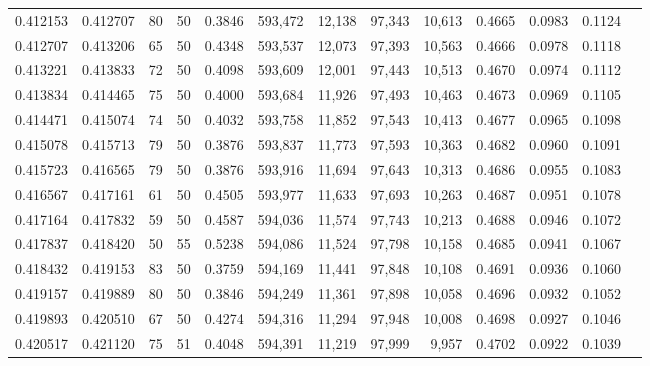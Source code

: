 \begin{tabular}{rrrrrrrrrrrrr}
0.412153 & 0.412707 &    80 &  50 &                                     0.3846 & 593,472 &  12,138 &  97,343 &  10,613 & 0.4665 & 0.0983 & 0.1124 \\
0.412707 & 0.413206 &    65 &  50 &                                     0.4348 & 593,537 &  12,073 &  97,393 &  10,563 & 0.4666 & 0.0978 & 0.1118 \\
0.413221 & 0.413833 &    72 &  50 &                                     0.4098 & 593,609 &  12,001 &  97,443 &  10,513 & 0.4670 & 0.0974 & 0.1112 \\
0.413834 & 0.414465 &    75 &  50 &                                     0.4000 & 593,684 &  11,926 &  97,493 &  10,463 & 0.4673 & 0.0969 & 0.1105 \\
0.414471 & 0.415074 &    74 &  50 &                                     0.4032 & 593,758 &  11,852 &  97,543 &  10,413 & 0.4677 & 0.0965 & 0.1098 \\
0.415078 & 0.415713 &    79 &  50 &                                     0.3876 & 593,837 &  11,773 &  97,593 &  10,363 & 0.4682 & 0.0960 & 0.1091 \\
0.415723 & 0.416565 &    79 &  50 &                                     0.3876 & 593,916 &  11,694 &  97,643 &  10,313 & 0.4686 & 0.0955 & 0.1083 \\
0.416567 & 0.417161 &    61 &  50 &                                     0.4505 & 593,977 &  11,633 &  97,693 &  10,263 & 0.4687 & 0.0951 & 0.1078 \\
0.417164 & 0.417832 &    59 &  50 &                                     0.4587 & 594,036 &  11,574 &  97,743 &  10,213 & 0.4688 & 0.0946 & 0.1072 \\
0.417837 & 0.418420 &    50 &  55 &                                     0.5238 & 594,086 &  11,524 &  97,798 &  10,158 & 0.4685 & 0.0941 & 0.1067 \\
0.418432 & 0.419153 &    83 &  50 &                                     0.3759 & 594,169 &  11,441 &  97,848 &  10,108 & 0.4691 & 0.0936 & 0.1060 \\
0.419157 & 0.419889 &    80 &  50 &                                     0.3846 & 594,249 &  11,361 &  97,898 &  10,058 & 0.4696 & 0.0932 & 0.1052 \\
0.419893 & 0.420510 &    67 &  50 &                                     0.4274 & 594,316 &  11,294 &  97,948 &  10,008 & 0.4698 & 0.0927 & 0.1046 \\
0.420517 & 0.421120 &    75 &  51 &                                     0.4048 & 594,391 &  11,219 &  97,999 &   9,957 & 0.4702 & 0.0922 & 0.1039 \\

\end{tabular}
